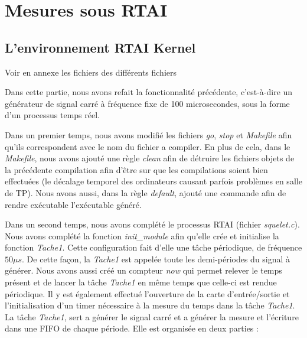 \section{Mesures sous RTAI}
\subsection{L'environnement RTAI Kernel}
\begin{center}
Voir en annexe les fichiers des différents fichiers
\end{center}
Dans cette partie, nous avons refait la fonctionnalité précédente, c'est-à-dire un générateur de signal carré à fréquence fixe  de 100 microsecondes, sous la forme d'un processus temps réel. 

Dans un premier temps, nous avons modifié les fichiers \emph{go}, \emph{stop} et \emph{Makefile} afin qu'ils correspondent avec le nom du fichier a compiler. En plus de cela, dans le \emph{Makefile}, nous avons ajouté une règle \emph{clean} afin de détruire les fichiers objets de la précédente compilation afin d'être sur que les compilations soient bien effectuées (le décalage temporel des ordinateurs causant parfois problèmes en salle de TP). Nous avons aussi, dans la règle \emph{default}, ajouté une commande afin de rendre exécutable l'exécutable généré.

Dans un second temps, nous avons complété le processus RTAI (fichier \emph{squelet.c}).\\


Nous avons complété la  fonction \emph{init\_module} afin qu'elle crée et initialise la fonction \emph{Tache1}. Cette configuration fait d'elle une tâche périodique, de fréquence $50 \mu s$. De cette façon, la \emph{Tache1} est appelée toute les demi-périodes du signal à générer. Nous avons aussi créé un compteur \emph{now} qui permet relever le temps présent et de lancer la tâche \emph{Tache1} en même temps que celle-ci est rendue périodique. Il y est également effectué l'ouverture de la carte d'entrée/sortie et l'initialisation d'un timer nécessaire à la mesure du temps dans la tâche \emph{Tache1}. \\


La tâche \emph{Tache1}, sert a générer le signal carré et a générer la mesure et l'écriture dans une FIFO de chaque période. Elle est organisée en deux parties : \\

